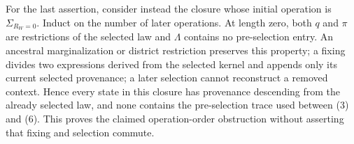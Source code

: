 For the last assertion, consider instead the closure whose initial operation is \(\Sigma_{R_W=0}\). Induct on the number of later operations. At length zero, both \(q\) and \(\pi\) are restrictions of the selected law and \(\Lambda\) contains no pre-selection entry. An ancestral marginalization or district restriction preserves this property; a fixing divides two expressions derived from the selected kernel and appends only its current selected provenance; a later selection cannot reconstruct a removed context. Hence every state in this closure has provenance descending from the already selected law, and none contains the pre-selection trace used between (3) and (6). This proves the claimed operation-order obstruction without asserting that fixing and selection commute.
